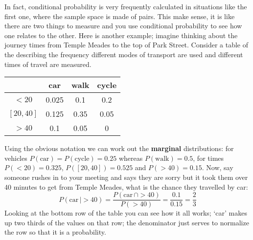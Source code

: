 \documentclass[11pt,a4paper]{scrartcl}
\begin{document}
In fact, conditional probability is very frequently calculated in
situations like the first one, where the sample space is made of
pairs. This make sense, it is like there are two things to measure and
you use conditional probability to see how one relates to the
other. Here is another example; imagine thinking about the journey
times from Temple Meades to the top of Park Street. Consider a table
of the describing the frequency different modes of transport are used and different times of travel are measured.
\begin{center}
\begin{tabular}{c|ccc}
        &car    &walk  &cycle\\
\hline
$<20$     &0.025  &0.1   &0.2\\
$[20,40]$ &0.125  &0.35  &0.05\\
$>40$     &0.1    &0.05  &0
\end{tabular}
\end{center}
Using the obvious notation we can work out the \textbf{marginal}
distributions: for vehicles $P(\mbox{car})=P(\mbox{cycle})=0.25$ whereas
$P(\mbox{walk})=0.5$, for times $P(<20)=0.325$, $P([20,40])=0.525$ and
$P(>40)=0.15$. Now, say someone rushes in to your meeting and says
they are sorry but it took them over 40 minutes to get from Temple
Meades, what is the chance they travelled by car:
\begin{equation}
P(\mbox{car}\,|>40)=\frac{P(\mbox{car}\,\cap >40)}{P(>40)}=\frac{0.1}{0.15}=\frac{2}{3}
\end{equation}
Looking at the bottom row of the table you can see how it all works;
\lq{}car\rq{} makes up two thirds of the values on that row; the
denominator just serves to normalize the row so that it is a
probability.
\end{document}
